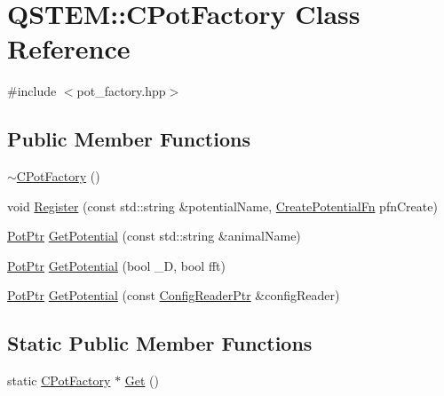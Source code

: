 \hypertarget{class_q_s_t_e_m_1_1_c_pot_factory}{\section{Q\-S\-T\-E\-M\-:\-:C\-Pot\-Factory Class Reference}
\label{class_q_s_t_e_m_1_1_c_pot_factory}
}


{\ttfamily \#include $<$pot\-\_\-factory.\-hpp$>$}

\subsection*{Public Member Functions}
\begin{DoxyCompactItemize}
\item 
\hyperlink{class_q_s_t_e_m_1_1_c_pot_factory_a04bffb2d5ac63eca185a40ac19c0d004}{$\sim$\-C\-Pot\-Factory} ()
\item 
void \hyperlink{class_q_s_t_e_m_1_1_c_pot_factory_a0b223854203fa17a2dbc3d95e5005ab5}{Register} (const std\-::string \&potential\-Name, \hyperlink{namespace_q_s_t_e_m_a3f54159e85da43c662b044e310591f3f}{Create\-Potential\-Fn} pfn\-Create)
\item 
\hyperlink{namespace_q_s_t_e_m_ae5a1cfb98b70a68e1c9b3fd1f50ab4b5}{Pot\-Ptr} \hyperlink{class_q_s_t_e_m_1_1_c_pot_factory_afa6f489660d3ee97089c6475b89f71fe}{Get\-Potential} (const std\-::string \&animal\-Name)
\item 
\hyperlink{namespace_q_s_t_e_m_ae5a1cfb98b70a68e1c9b3fd1f50ab4b5}{Pot\-Ptr} \hyperlink{class_q_s_t_e_m_1_1_c_pot_factory_a617938aada8668eb219193f5d8203596}{Get\-Potential} (bool \-\_\-D, bool fft)
\item 
\hyperlink{namespace_q_s_t_e_m_ae5a1cfb98b70a68e1c9b3fd1f50ab4b5}{Pot\-Ptr} \hyperlink{class_q_s_t_e_m_1_1_c_pot_factory_abd363f38decd44c63e0230b7c05fdbb8}{Get\-Potential} (const \hyperlink{namespace_q_s_t_e_m_af9424707fe9f6503298f49b41304bd35}{Config\-Reader\-Ptr} \&config\-Reader)
\end{DoxyCompactItemize}
\subsection*{Static Public Member Functions}
\begin{DoxyCompactItemize}
\item 
static \hyperlink{class_q_s_t_e_m_1_1_c_pot_factory}{C\-Pot\-Factory} $\ast$ \hyperlink{class_q_s_t_e_m_1_1_c_pot_factory_a8d2f254bfba82db82f9de32727f4c225}{Get} ()
\end{DoxyCompactItemize}


